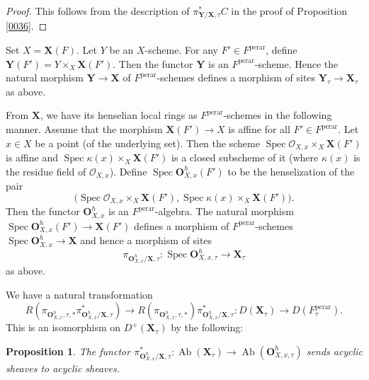 \documentclass{amsart}
\newtheorem{Prop}[Thm]{Proposition}
\theoremstyle{remark}
\numberwithin{equation}{subsection}
\newcommand{\Order}{\mathcal{O}}
\newcommand{\perar}{\mathrm{perar}}
\newcommand{\alg}[1]{\mathbf{#1}}
\DeclareMathOperator{\Spec}{Spec}
\DeclareMathOperator{\Ab}{Ab}
\begin{document}
\begin{proof}
	This follows from the description of $\pi_{\alg{Y} / \alg{X}, \tau}^{\ast} C$
	in the proof of Proposition \ref{0036}.
\end{proof}

Set $X = \alg{X}(F)$.
Let $Y$ be an $X$-scheme.
For any $F' \in F^{\perar}$,
define $\alg{Y}(F') = Y \times_{X} \alg{X}(F')$.
Then the functor $\alg{Y}$ is an $F^{\perar}$-scheme.
Hence the natural morphism $\alg{Y} \to \alg{X}$ of $F^{\perar}$-schemes
defines a morphism of sites $\alg{Y}_{\tau} \to \alg{X}_{\tau}$ as above.

From $\alg{X}$, we have its henselian local rings as $F^{\perar}$-schemes in the following manner.
Assume that the morphism $\alg{X}(F') \to X$ is affine for all $F' \in F^{\perar}$.
Let $x \in X$ be a point (of the underlying set).
Then the scheme $\Spec \Order_{X, x} \times_{X} \alg{X}(F')$ is affine
and $\Spec \kappa(x) \times_{X} \alg{X}(F')$ is a closed subscheme of it
(where $\kappa(x)$ is the residue field of $\Order_{X, x}$).
Define $\Spec \alg{O}_{X, x}^{h}(F')$ to be the henselization of the pair
	\[
		\bigl(
			\Spec \Order_{X, x} \times_{X} \alg{X}(F'),
			\Spec \kappa(x) \times_{X} \alg{X}(F')
		\bigr).
	\]
Then the functor $\alg{O}_{X, x}^{h}$ is an $F^{\perar}$-algebra.
The natural morphism $\Spec \alg{O}_{X, x}^{h}(F') \to \alg{X}(F')$ defines
a morphism of $F^{\perar}$-schemes $\Spec \alg{O}_{X, x}^{h} \to \alg{X}$ and hence
a morphism of sites
	\[
			\pi_{\alg{O}_{X, x}^{h} / \alg{X}, \tau}
		\colon
			\Spec \alg{O}_{X, x, \tau}^{h}
		\to
			\alg{X}_{\tau}
	\]
as above.

We have a natural transformation
	\[
			R(
				\pi_{\alg{O}_{X, x}^{h}, \tau, \ast}
				\pi_{\alg{O}_{X, x}^{h} / \alg{X}, \tau}^{\ast}
			)
		\to
			R(\pi_{\alg{O}_{X, x}^{h}, \tau, \ast})
			\pi_{\alg{O}_{X, x}^{h} / \alg{X}, \tau}^{\ast}
		\colon
			D(\alg{X}_{\tau})
		\to
			D(F^{\perar}_{\tau}).
	\]
This is an isomorphism on $D^{+}(\alg{X}_{\tau})$ by the following:

\begin{Prop} \label{0314}
	The functor
		$
				\pi_{\alg{O}_{X, x}^{h} / \alg{X}, \tau}^{\ast}
			\colon
				\Ab(\alg{X}_{\tau})
			\to
				\Ab(\alg{O}_{X, x, \tau}^{h})
		$
	sends acyclic sheaves to acyclic sheaves.
\end{Prop}
\end{document}
